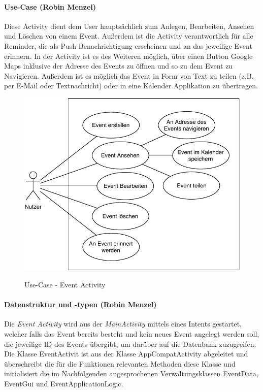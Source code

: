 \paragraph{Use-Case (Robin Menzel)}
Diese Activity dient dem User hauptsächlich zum Anlegen, Bearbeiten, Ansehen und Löschen von einem Event. Außerdem ist die Activity verantwortlich für alle Reminder, die als Push-Benachrichtigung erscheinen und an das jeweilige Event erinnern. In der Activity ist es des Weiteren möglich, über einen Button Google Maps inklusive der Adresse des Events zu öffnen und so zu dem Event zu Navigieren. Außerdem ist es möglich das Event in Form von Text zu teilen (z.B. per E-Mail oder Textnachricht) oder in eine Kalender Applikation zu übertragen.

\begin{figure}[H]
	\centering
	\caption{Use-Case - Event Activity}
	\includegraphics[width=12cm]{img/EventActivityUseCase.pdf}
	\label{img:EventActivityUseCase}
\end{figure}

\paragraph{Datenstruktur und -typen (Robin Menzel)}
Die \textit{Event Activity} wird aus der \textit{MainActivity} mittels eines Intents gestartet, welcher falls das Event bereits besteht und kein neues Event angelegt werden soll, die jeweilige ID des Events übergibt, um darüber auf die Datenbank zuzugreifen. Die Klasse EventActivit ist aus der Klasse AppCompatActivity abgeleitet und überschreibt die für die Funktionen relevanten Methoden diese Klasse und initialisiert die im Nachfolgenden angesprochenen Verwaltungsklassen EventData, EventGui und EventApplicationLogic.

